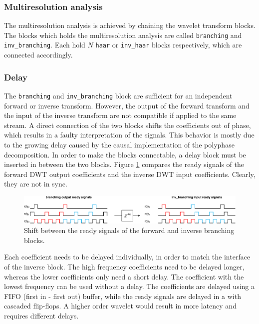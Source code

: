 \begin{refsection}
\subsubsection{Multiresolution analysis}

The multiresolution analysis is achieved by chaining the wavelet transform blocks.
The blocks which holds the multiresolution analysis are called \texttt{branching} and \texttt{inv\_branching}.
Each hold $N$ \texttt{haar} or \texttt{inv\_haar} blocks respectively, which are connected accordingly.

\subsubsection{Delay \label{fpga:sec:delay}}

The \texttt{branching} and \texttt{inv\_branching} block are sufficient for an independent forward or inverse transform.
However, the output of the forward transform and the input of the inverse transform are not compatible if applied to the same stream.
A direct connection of the two blocks shifts the coefficients out of phase, which results in a faulty interpretation of the signals.
This behavior is mostly due to the growing delay caused by the causal implementation of the polyphase decomposition.
In order to make the blocks connectable, a delay block must be inserted in between the two blocks.
Figure \ref{fpga:fig:delay} compares the ready signals of the forward DWT output coefficients and the inverse DWT input coefficients.
Clearly, they are not in sync.
\begin{figure}
	\centering
	\includegraphics[width=\hsize]{papers/fpga/images/delay.pdf}
	\caption{
		Shift between the ready signals of the forward and inverse branching blocks.
	}
	\label{fpga:fig:delay}
\end{figure}
Each coefficient needs to be delayed individually, in order to match the interface of the inverse block.
The high frequency coefficients need to be delayed longer, whereas the lower coefficients only need a short delay.
The coefficient with the lowest frequency can be used without a delay.
The coefficients are delayed using a FIFO (first in - first out) buffer, while the ready signals are delayed in a with cascaded flip-flops.
A higher order wavelet would result in more latency and requires different delays. 


\end{refsection}
